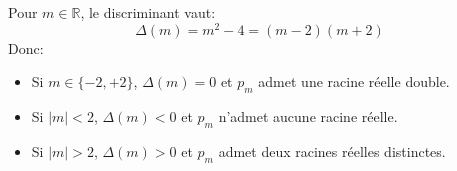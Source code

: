 Pour $m\in\mathbb{R}$, le discriminant vaut:
\[
\Delta(m)=m^2-4=(m-2)(m+2)
\]
Donc:
\begin{itemize}
  \item Si $m\in\{-2,+2\}$, $\Delta(m)=0$ et $p_m$ admet une racine réelle double.
  \item Si $|m|<2$, $\Delta(m)<0$ et $p_m$ n'admet aucune racine réelle.
  \item Si $|m|>2$, $\Delta(m)>0$ et $p_m$ admet deux racines réelles distinctes.
\end{itemize}
